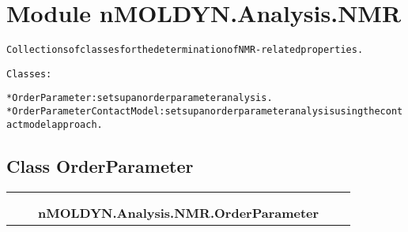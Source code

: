 %
%
%


\section{Module nMOLDYN.Analysis.NMR}

    \label{nMOLDYN:Analysis:NMR}
\begin{alltt}
Collections of classes for the determination of NMR-related properties.

Classes:

    * OrderParameter             : sets up an order parameter analysis.
    * OrderParameterContactModel : sets up an order parameter analysis using the contact model approach.
\end{alltt}



\subsection{Class OrderParameter}

    \label{nMOLDYN:Analysis:NMR:OrderParameter}
\begin{tabular}{cccccc}
\multicolumn{2}{r}{\settowidth{\BCL}{nMOLDYN.Analysis.Analysis.Analysis}\multirow{2}{\BCL}{nMOLDYN.Analysis.Analysis.Analysis}}
&&
  \\\cline{3-3}
  &&\multicolumn{1}{c|}{}
&&
  \\
&&\multicolumn{2}{l}{\textbf{nMOLDYN.Analysis.NMR.OrderParameter}}
\end{tabular}


